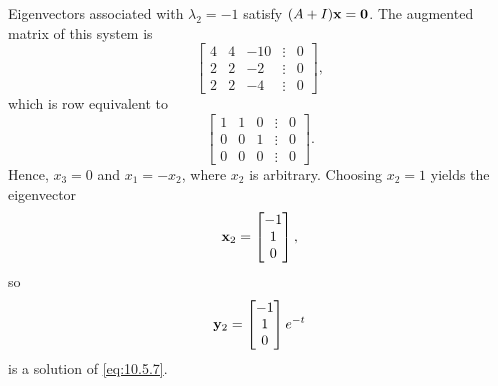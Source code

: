\documentclass{ximera}
\begin{document}
\begin{example}
\begin{explanation}
Eigenvectors associated with $\lambda_2 =-1$ satisfy $(A+I){\bf
x}={\bf 0}$. The  augmented matrix of this system is
$$
\begin{bmatrix} 4 & 4 & -10 &\vdots & 0\\ 2 & 2 & -2 &
\vdots & 0\\2 & 2 & -4 &\vdots & 0\end{bmatrix},
$$
which is row equivalent to
$$
\begin{bmatrix} 1 & 1 & 0 &\vdots& 0\\ 0 & 0 & 1
&\vdots& 0
\\ 0 & 0 & 0 &\vdots&0\end{bmatrix}.
$$
Hence, $x_3=0$ and $x_1 =-x_2$, where $x_2$ is
arbitrary. Choosing $x_2=1$  yields the eigenvector
$$
{\bf x}_2=\begin{bmatrix}-1\\1\\0\end{bmatrix},
$$
so
$$
{\bf y}_2 =\begin{bmatrix}-1\\1\\0\end{bmatrix}e^{-t}
$$
is a solution of  \eqref{eq:10.5.7}.


\end{explanation}
\end{example}
\end{document}
